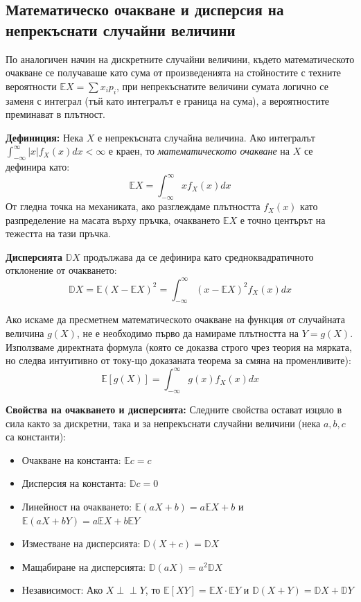\documentclass{article}
\begin{document}
\subsection{Математическо очакване и дисперсия на непрекъснати случайни величини}

По аналогичен начин на дискретните случайни величини, където математическото очакване се получаваше като сума от произведенията на стойностите с техните вероятности $\mathbb{E}X = \sum x_i p_i$, при непрекъснатите величини сумата логично се заменя с интеграл (тъй като интегралът е граница на сума), а вероятностите преминават в плътност.

\textbf{Дефиниция:} Нека $X$ е непрекъсната случайна величина. Ако интегралът $\int_{-\infty}^{\infty} |x| f_X(x) dx < \infty$ е краен, то \emph{математическото очакване} на $X$ се дефинира като:
\[
\mathbb{E}X = \int_{-\infty}^{\infty} x f_X(x) dx
\]
От гледна точка на механиката, ако разглеждаме плътността $f_X(x)$ като разпределение на масата върху пръчка, очакването $\mathbb{E}X$ е точно центърът на тежестта на тази пръчка.

\textbf{Дисперсията} $\mathbb{D}X$ продължава да се дефинира като средноквадратичното отклонение от очакването:
\[
\mathbb{D}X = \mathbb{E}(X - \mathbb{E}X)^2 = \int_{-\infty}^{\infty} (x - \mathbb{E}X)^2 f_X(x) dx
\]

Ако искаме да пресметнем математическото очакване на функция от случайната величина $g(X)$, не е необходимо първо да намираме плътността на $Y=g(X)$. Използваме директната формула (която се доказва строго чрез теория на мярката, но следва интуитивно от току-що доказаната теорема за смяна на променливите):
\[
\mathbb{E}[g(X)] = \int_{-\infty}^{\infty} g(x) f_X(x) dx
\]

\textbf{Свойства на очакването и дисперсията:}
Следните свойства остават изцяло в сила както за дискретни, така и за непрекъснати случайни величини (нека $a, b, c$ са константи):
\begin{itemize}
    \item Очакване на константа: $\mathbb{E}c = c$
    \item Дисперсия на константа: $\mathbb{D}c = 0$
    \item Линейност на очакването: $\mathbb{E}(aX + b) = a\mathbb{E}X + b$ и $\mathbb{E}(aX + bY) = a\mathbb{E}X + b\mathbb{E}Y$
    \item Изместване на дисперсията: $\mathbb{D}(X + c) = \mathbb{D}X$
    \item Мащабиране на дисперсията: $\mathbb{D}(aX) = a^2 \mathbb{D}X$
    \item Независимост: Ако $X \perp\!\!\!\perp Y$, то $\mathbb{E}[XY] = \mathbb{E}X \cdot \mathbb{E}Y$ и $\mathbb{D}(X + Y) = \mathbb{D}X + \mathbb{D}Y$
\end{itemize}
\end{document}
